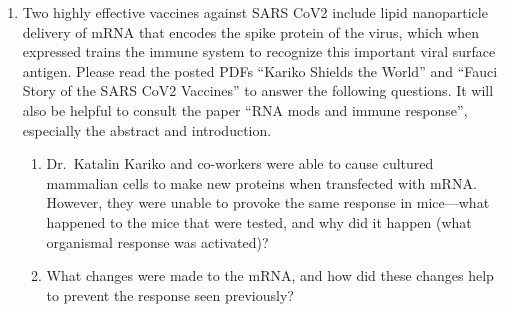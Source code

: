 \documentclass[basic]{inVerba-notes}
\begin{document}
\begin{enumerate}[align=left, leftmargin=0pt, labelindent=\parindent, listparindent=\parindent, labelwidth=0pt, itemindent=!]
  \item {} Two highly effective vaccines against SARS CoV2 include lipid nanoparticle delivery of mRNA that encodes the spike protein of the virus, which when expressed trains the immune system to recognize this important viral surface antigen. Please read the posted PDFs “Kariko Shields the World” and “Fauci Story of the SARS CoV2 Vaccines” to answer the following questions. It will also be helpful to consult the paper “RNA mods and immune response”, especially the abstract and introduction.
  \begin{enumerate}
    \item {} Dr.\ Katalin Kariko and co-workers were able to cause cultured mammalian cells to make new proteins when transfected with mRNA\@. However, they were unable to provoke the same response in mice---what happened to the mice that were tested, and why did it happen (what organismal response was activated)?
    
    \item {} What changes were made to the mRNA, and how did these changes help to prevent the response seen previously?
    

\end{enumerate}
\end{enumerate}
\end{document}
